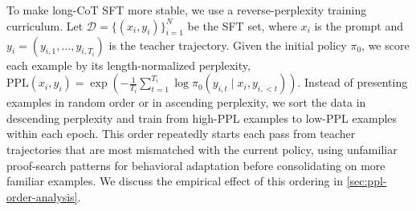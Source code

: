 To make long-CoT SFT more stable, we use a reverse-perplexity training curriculum. Let
\(\mathcal{D}=\{(x_i,y_i)\}_{i=1}^{N}\) be the SFT set, where \(x_i\) is the
prompt and \(y_i=(y_{i,1},\ldots,y_{i,T_i})\) is the teacher trajectory. Given
the initial policy \(\pi_0\), we score each example by its length-normalized
perplexity, \(\mathrm{PPL}(x_i,y_i)=\exp\left(-\frac{1}{T_i}\sum_{t=1}^{T_i}
\log \pi_0(y_{i,t}\mid x_i,y_{i,<t})\right)\).
Instead of presenting examples in random order or in ascending perplexity, we
sort the data in descending perplexity and train from high-PPL examples to
low-PPL examples within each epoch. This order repeatedly starts each pass from
teacher trajectories that are most mismatched with the current policy, using
unfamiliar proof-search patterns for behavioral adaptation before consolidating
on more familiar examples. We discuss the empirical effect of this ordering in
\cref{sec:ppl-order-analysis}.
